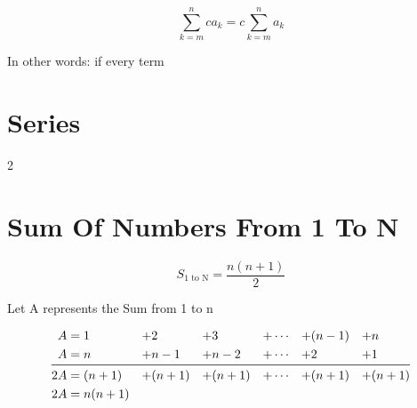\[\sum\limits_{k=m}^n ca_{k}=c\sum\limits_{k=m}^n a_{k}\]

In other words: if every term

\section{Series}

2

\section{Sum Of Numbers From 1 To N}

\begin{equation}
  S_{\text{1 to N}}=\frac{n(n+1)}{2}
\end{equation}

Let A represents the Sum from 1 to n

\begin{equation*}
\begin{aligned}
  A&=1 &+ &2 &+ &3 &+ &\cdots &+ &(n-1) &+ &n\\
  A&=n &+ &n-1 &+ &n-2 &+ &\cdots &+ &2 &+ &1\\
  \midrule
  2A&=(n+1) &+ &(n+1) &+ &(n+1) &+ &\cdots  &+ &(n+1) &+ &(n+1)\\
  2A&= n(n+1)\\
\end{aligned}
\end{equation*}

